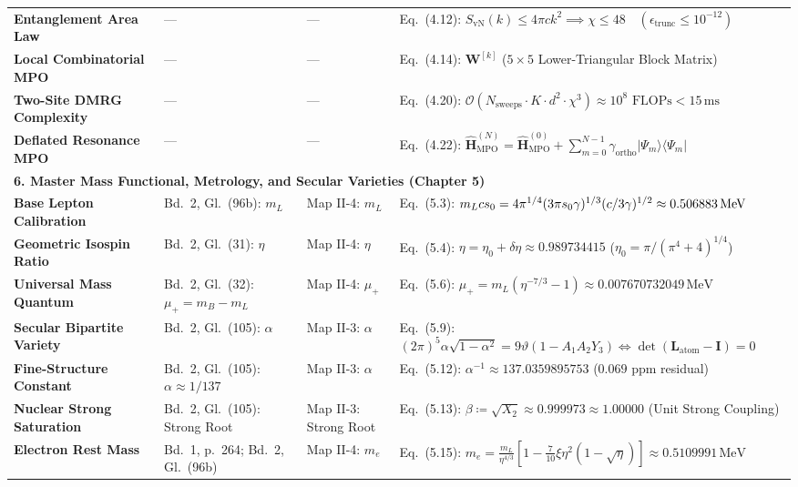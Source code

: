\documentclass[
    12pt,
    a4paper,
    headings=normal,
    twoside=false,
    open=any,
    parskip=half
]{scrbook}
\let\hbar\relax
\begin{document}
\begin{longtable}{p{3.4cm}p{3.2cm}p{3.2cm}p{5.4cm}}
\textbf{Entanglement Area Law} & — & — & Eq.~(4.12): $S_{\text{vN}}(k) \le 4\pi c k^2 \implies \chi \le 48 \quad (\epsilon_{\text{trunc}} \le 10^{-12})$ \\
\textbf{Local Combinatorial MPO} & — & — & Eq.~(4.14): $\mathbf{W}^{[k]}$ ($5 \times 5$ Lower-Triangular Block Matrix) \\
\textbf{Two-Site DMRG Complexity} & — & — & Eq.~(4.20): $\mathcal{O}(N_{\text{sweeps}} \cdot K \cdot d^2 \cdot \chi^3) \approx 10^8 \text{ FLOPs} < 15\,\text{ms}$ \\
\textbf{Deflated Resonance MPO} & — & — & Eq.~(4.22): $\hat{\mathbf{H}}_{\text{MPO}}^{(N)} = \hat{\mathbf{H}}_{\text{MPO}}^{(0)} + \sum_{m=0}^{N-1} \gamma_{\text{ortho}} |\Psi_m\rangle\langle\Psi_m|$ \\\midrule
\multicolumn{4}{l}{\textsf{\textbf{\color{maincolor!90!black}6. Master Mass Functional, Metrology, and Secular Varieties (Chapter 5)}}} \\\midrule
\textbf{Base Lepton Calibration} & Bd.~2, Gl.~(96b): $m_L$ & Map II-4: $m_L$ & Eq.~(5.3): $m_L c s_0 = 4\pi^{1/4}(3\pi s_0\gamma\hbar)^{1/3}(c\hbar/3\gamma)^{1/2} \approx 0.506883\,\text{MeV}$ \\
\textbf{Geometric Isospin Ratio} & Bd.~2, Gl.~(31): $\eta$ & Map II-4: $\eta$ & Eq.~(5.4): $\eta = \eta_0 + \delta\eta \approx 0.989734415$ ($\eta_0 = \pi/(\pi^4+4)^{1/4}$) \\
\textbf{Universal Mass Quantum} & Bd.~2, Gl.~(32): $\mu_+ = m_B - m_L$ & Map II-4: $\mu_+$ & Eq.~(5.6): $\mu_+ = m_L (\eta^{-7/3} - 1) \approx 0.007670732049\,\text{MeV}$ \\
\textbf{Secular Bipartite Variety} & Bd.~2, Gl.~(105): $\alpha$ & Map II-3: $\alpha$ & Eq.~(5.9): $(2\pi)^5\alpha\sqrt{1-\alpha^2} = 9\vartheta(1 - A_1 A_2 Y_3) \iff \det(\mathbf{L}_{\text{atom}}-\mathbf{I})=0$ \\
\textbf{Fine-Structure Constant} & Bd.~2, Gl.~(105): $\alpha \approx 1/137$ & Map II-3: $\alpha$ & Eq.~(5.12): $\alpha^{-1} \approx 137.0359895753$ ($0.069\text{ ppm}$ residual) \\
\textbf{Nuclear Strong Saturation} & Bd.~2, Gl.~(105): Strong Root & Map II-3: Strong Root& Eq.~(5.13): $\beta \coloneqq \sqrt{X_2} \approx 0.999973 \approx 1.00000$ (Unit Strong Coupling) \\
\textbf{Electron Rest Mass} & Bd.~1, p.~264; Bd.~2, Gl.~(96b) & Map II-4: $m_e$ & Eq.~(5.15): $m_e = \frac{m_L}{\eta^{4/3}}[1 - \frac{7}{10}\xi\eta^2(1-\sqrt{\eta})] \approx 0.5109991\,\text{MeV}$ \\

\end{longtable}
\end{document}
